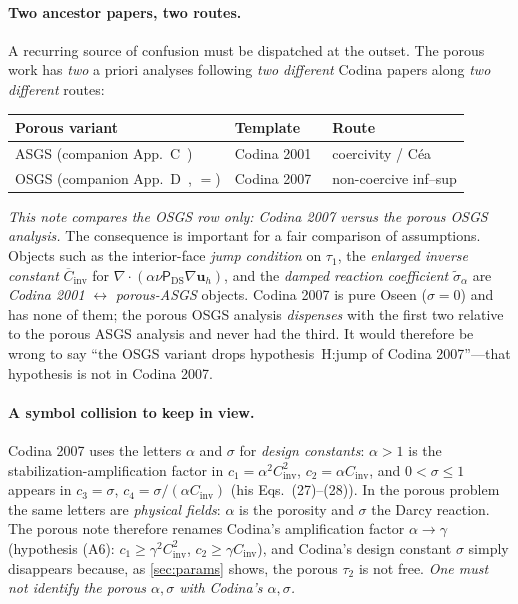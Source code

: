 \documentclass[11pt]{article}
\theoremstyle{remark}
\newcommand{\bu}{\boldsymbol{u}}
\newcommand{\ViscProj}{\mathsf{P}_{\mathrm{DS}}}
\newcommand{\sigmatilde}{\widetilde{\sigma}_{\alpha}}
\begin{document}
\paragraph{Two ancestor papers, two routes.}
A recurring source of confusion must be dispatched at the outset. The porous work has
\emph{two} a priori analyses following \emph{two different} Codina papers along
\emph{two different} routes:
\begin{center}
\begin{tabular}{@{}lll@{}}
\toprule
Porous variant & Template & Route \\
\midrule
ASGS (companion App.~C~\cite{companion}) & Codina 2001~\cite{Codina2001} & coercivity / C\'ea \\
OSGS (companion App.~D~\cite{companion}, $=$\cite{osgsnote}) & Codina 2007~\cite{Codina2008} & non-coercive inf--sup \\
\bottomrule
\end{tabular}
\end{center}
\emph{This note compares the OSGS row only: Codina 2007 versus the porous OSGS analysis.}
The consequence is important for a fair comparison of assumptions. Objects such as the
interior-face \emph{jump condition} on $\tau_1$, the \emph{enlarged inverse constant}
$\overline{C}_{\mathrm{inv}}$ for $\nabla\cdot(\alpha\nu\ViscProj\nabla\bu_h)$, and the
\emph{damped reaction coefficient} $\sigmatilde$ are \emph{Codina 2001} $\leftrightarrow$
\emph{porous-ASGS} objects. Codina 2007 is pure Oseen ($\sigma=0$) and has none of them; the
porous OSGS analysis \emph{dispenses} with the first two relative to the porous ASGS analysis
and never had the third. It would therefore be wrong to say ``the OSGS variant drops
hypothesis~H:jump of Codina 2007''---that hypothesis is not in Codina 2007.

\paragraph{A symbol collision to keep in view.}
Codina 2007 uses the letters $\alpha$ and $\sigma$ for \emph{design constants}:
$\alpha>1$ is the stabilization-amplification factor in $c_1=\alpha^2C_{\mathrm{inv}}^2$,
$c_2=\alpha C_{\mathrm{inv}}$, and $0<\sigma\le1$ appears in $c_3=\sigma$,
$c_4=\sigma/(\alpha C_{\mathrm{inv}})$ (his Eqs.~(27)--(28)). In the porous problem the
same letters are \emph{physical fields}: $\alpha$ is the porosity and $\sigma$ the Darcy
reaction. The porous note therefore renames Codina's amplification factor $\alpha\to\gamma$
(hypothesis (A6): $c_1\ge\gamma^2C_{\mathrm{inv}}^2$, $c_2\ge\gamma C_{\mathrm{inv}}$), and
Codina's design constant $\sigma$ simply disappears because, as \cref{sec:params} shows,
the porous $\tau_2$ is not free. \emph{One must not identify the porous $\alpha,\sigma$
with Codina's $\alpha,\sigma$.}
\end{document}
